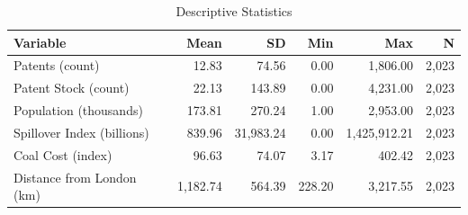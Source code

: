 \begin{table}[!htbp]
\centering
\caption{Descriptive Statistics}
\label{tab:descriptive}
\footnotesize
\begin{tabular}{lrrrrr}
\toprule
Variable & Mean & SD & Min & Max & N \\
\midrule
Patents (count) & 12.83 & 74.56 & 0.00 & 1,806.00 & 2,023 \\
Patent Stock (count) & 22.13 & 143.89 & 0.00 & 4,231.00 & 2,023 \\
Population (thousands) & 173.81 & 270.24 & 1.00 & 2,953.00 & 2,023 \\
Spillover Index (billions) & 839.96 & 31,983.24 & 0.00 & 1,425,912.21 & 2,023 \\
Coal Cost (index) & 96.63 & 74.07 & 3.17 & 402.42 & 2,023 \\
Distance from London (km) & 1,182.74 & 564.39 & 228.20 & 3,217.55 & 2,023 \\
\bottomrule
\end{tabular}
\end{table}
